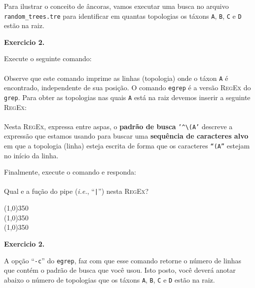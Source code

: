 \begin{refsection}
Para ilustrar o conceito de âncoras, vamos executar uma busca no arquivo \texttt{random\_trees.tre} para identificar em quantas topologias os táxons \texttt{A}, \texttt{B}, \texttt{C} e \texttt{D} estão na raiz.\\

\begin{blackBlock}{\textbf{Exercicio 2.}}\label{tut2:ex:2.\arabic{ex}}

Execute o seguinte comando:\\
\\

Observe que este comando imprime as linhas (topologia) onde o táxon \texttt{A} é encontrado, independente de sua posição. O comando \texttt{egrep} é a versão \textsc{RegEx} do \texttt{grep}. Para obter as topologias nas quais \texttt{A} está na raiz devemos inserir a seguinte \textsc{RegEx}:\\
\\

Nesta \textsc{RegEx}, expressa entre aspas, o \textbf{padrão de busca} \texttt{'\^{}\textbackslash (A'} descreve a expressão que estamos usando para buscar uma \textbf{sequência de caracteres alvo} em que a topologia (linha) esteja escrita de forma que os caracteres \texttt{``(A''} estejam no início da linha.

Finalmente, execute o comando e responda:\\
\\

Qual e a fução do pipe (\textit{i.e.}, ``\texttt{|}'') nesta \textsc{RegEx}?

\begin{center}
\line(1,0){350}\\
\line(1,0){350}\\
\line(1,0){350}\\
\end{center}

\end{blackBlock}

\vspace{15pt}

\begin{blackBlock}{\textbf{Exercicio 2.}}\label{tut2:ex:9.\arabic{ex}}

A opção ``\texttt{-c}'' do \texttt{egrep}, faz com que esse comando retorne o número de linhas que contém o padrão de busca que você usou. Isto posto, você deverá anotar abaixo o número de topologias que os táxons \texttt{A}, \texttt{B}, \texttt{C} e \texttt{D} estão na raiz.\\


\end{blackBlock}
\end{refsection}
